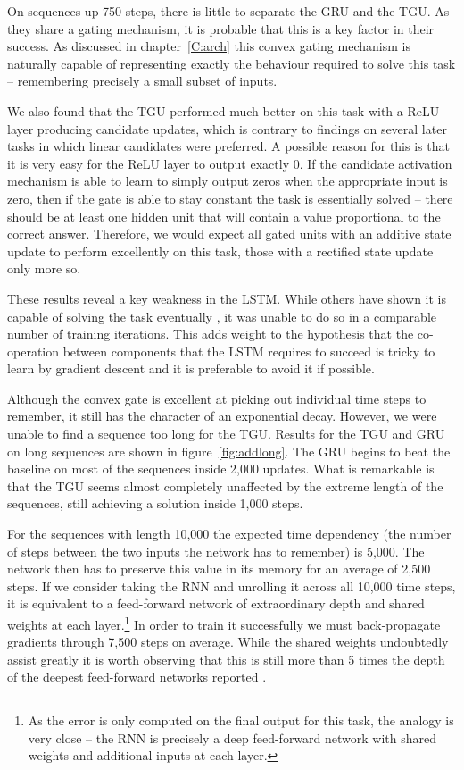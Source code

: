 On sequences up 750 steps, there is little to separate the GRU and the TGU. As they share a gating
mechanism, it is probable that this is a key factor in their success. As discussed in
chapter~\ref{C:arch} this convex gating mechanism is naturally capable of representing exactly the
behaviour required to solve this task -- remembering precisely a small subset of inputs.

We also
found that the TGU performed much better on this task with a ReLU layer producing candidate updates,
which is contrary to findings on several later tasks in which linear candidates were preferred.
A possible reason for this is that it is very easy for the ReLU layer to output exactly \(0\).
If the candidate activation mechanism is able to learn to simply output zeros when the appropriate
input is zero, then if the gate is able to stay constant the task is essentially solved -- there should
be at least one hidden unit that will contain a value proportional to the correct answer. Therefore,
we would expect all gated units with an additive state update to perform excellently on this task, those
with a rectified state update only more so.

These results reveal a key weakness in the LSTM. While others have shown 
it is capable of solving the task eventually \autocite{Henaff2016}, it was unable to do so in a comparable
number of training iterations.
This adds weight to the hypothesis that the co-operation between components that the LSTM requires to succeed
is tricky to learn by gradient descent and it is preferable to avoid it if possible.

Although the convex gate is excellent at picking out individual time steps to remember, it still
has the character of an exponential decay. However, 
we were unable to find a sequence too long for the TGU. 
Results for the TGU and GRU on long sequences are shown in 
figure~\ref{fig:addlong}. The GRU begins to beat the baseline on most of the
 sequences inside 2,000 updates. What is remarkable is that the TGU seems almost completely unaffected by the
extreme length of the sequences, still achieving a solution inside 1,000 steps.

For the sequences with length 10,000 the expected time dependency (the number of steps between the
two inputs the network has to remember) is 5,000. The network then has to preserve this value in its
memory for an average of 2,500 steps. If we consider taking the RNN and unrolling it across all 10,000
time steps, it is equivalent to a feed-forward network of extraordinary depth and shared weights at each
layer.\footnote{As the error is only computed on the final output for this task, the analogy is very
close -- the RNN is precisely a deep feed-forward network with shared weights and additional inputs
at each layer.} In order to train it successfully we must back-propagate gradients through
7,500 steps on average. While the shared weights undoubtedly assist greatly it is worth observing that this
is still more than 5 times the depth of the deepest feed-forward networks reported
\autocite{Huang2016}.


